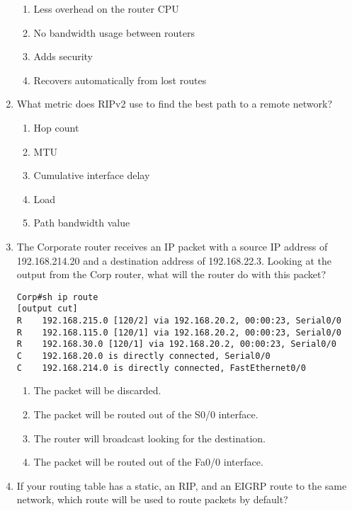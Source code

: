\begin{enumerate}
  \begin{enumerate}
  \tightlist
  \item
    Less overhead on the router CPU
  \item
    No bandwidth usage between routers
  \item
    Adds security
  \item
    Recovers automatically from lost routes
  \end{enumerate}
\item
  What metric does RIPv2 use to find the best path to a remote network?

  \begin{enumerate}
  \tightlist
  \item
    Hop count
  \item
    MTU
  \item
    Cumulative interface delay
  \item
    Load
  \item
    Path bandwidth value
  \end{enumerate}
\item
  The Corporate router receives an IP packet with a source IP address of
  192.168.214.20 and a destination address of 192.168.22.3. Looking at
  the output from the Corp router, what will the router do with this
  packet?

\begin{verbatim}
Corp#sh ip route
[output cut]
R    192.168.215.0 [120/2] via 192.168.20.2, 00:00:23, Serial0/0
R    192.168.115.0 [120/1] via 192.168.20.2, 00:00:23, Serial0/0
R    192.168.30.0 [120/1] via 192.168.20.2, 00:00:23, Serial0/0
C    192.168.20.0 is directly connected, Serial0/0
C    192.168.214.0 is directly connected, FastEthernet0/0
\end{verbatim}

  \begin{enumerate}
  \tightlist
  \item
    The packet will be discarded.
  \item
    The packet will be routed out of the S0/0 interface.
  \item
    The router will broadcast looking for the destination.
  \item
    The packet will be routed out of the Fa0/0 interface.
  \end{enumerate}
\item
  If your routing table has a static, an RIP, and an EIGRP route to the
  same network, which route will be used to route packets by default?


\end{enumerate}
